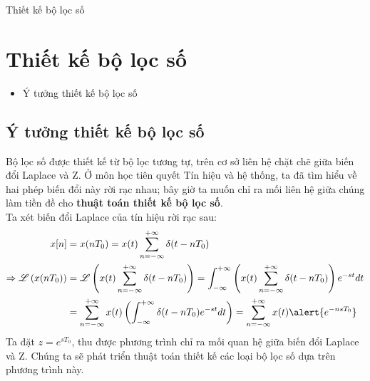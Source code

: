 \documentclass[8pt]{beamer}
\begin{document}
\begin{frame}{Thiết kế bộ lọc số}
	\section{Thiết kế bộ lọc số}
\begin{itemize}
	\item Ý tưởng thiết kế bộ lọc số
\end{itemize}
\subsection{Ý tưởng thiết kế bộ lọc số}
Bộ lọc số được thiết kế từ bộ lọc tương tự, trên cơ sở liên hệ chặt chẽ giữa biến đổi Laplace và Z. Ở môn học tiên quyết \alert{Tín hiệu và hệ thống}, ta đã tìm hiểu về hai phép biến đổi này rời rạc nhau; bây giờ ta muốn chỉ ra mối liên hệ giữa chúng làm tiền đề cho \textbf{thuật toán thiết kế bộ lọc số}.
\\Ta xét biến đổi Laplace của tín hiệu rời rạc sau:
\begin{equation*}
\begin{split}
	x[n]&=x(nT_{0})=x(t)\sum_{n=-\infty}^{+\infty}\delta(t-nT_{0})\\
\Rightarrow \mathscr{L}\left(x(nT_{0})\right)&=\mathscr{L}\left(x(t)\sum_{n=-\infty}^{+\infty}\delta(t-nT_{0})\right)=\int_{-\infty}^{+\infty}\left(x(t)\sum_{n=-\infty}^{+\infty}\delta(t-nT_{0})\right)e^{-st}dt\\
					     &=\sum_{n=-\infty}^{+\infty}x(t)\left(\int_{-\infty}^{+\infty}\delta(t-nT_{0})e^{-st}dt\right)=\sum_{n=-\infty}^{+\infty}x(t)\alert{e^{-nsT_{0}}}
\end{split}
\end{equation*}
Ta đặt $z=e^{sT_{0}}$, thu được phương trình chỉ ra mối quan hệ giữa biến đổi Laplace và Z. Chúng ta sẽ phát triển thuật toán thiết kế các loại bộ lọc số dựa trên phương trình này.
\end{frame}
\end{document}
